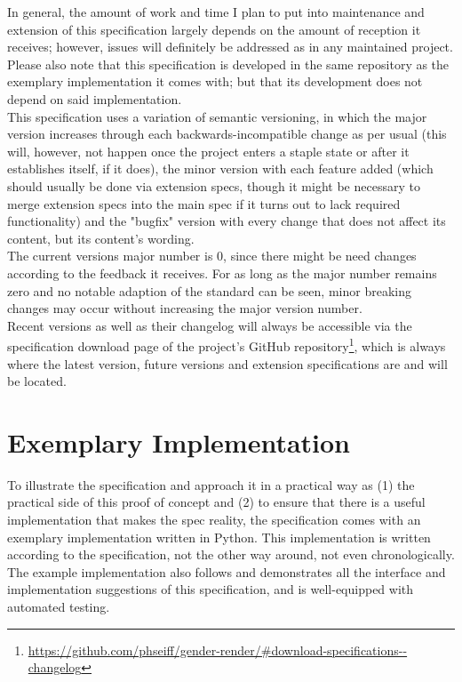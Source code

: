 \documentclass{article}
\begin{document}
    In general, the amount of work and time I plan to put into maintenance and extension of this specification largely depends on the amount of reception it receives;
    however, issues will definitely be addressed as in any maintained project.
    Please also note that this specification is developed in the same repository as the exemplary implementation it comes with;
    but that its development does not depend on said implementation.\\

    This specification uses a variation of semantic versioning, in which the major version increases through each backwards-incompatible change as per usual (this will, however, not happen once the project enters a staple state or after it establishes itself, if it does), the minor version with each feature added (which should usually be done via extension specs, though it might be necessary to merge extension specs into the main spec if it turns out to lack required functionality) and the "bugfix" version with every change that does not affect its content, but its content's wording.\\

    The current versions major number is 0, since there might be need changes according to the feedback it receives.
    For as long as the major number remains zero and no notable adaption of the standard can be seen, minor breaking changes may occur without increasing the major version number.\\

    Recent versions as well as their changelog will always be accessible via the specification download page of the project's GitHub repository\footnote{\url{https://github.com/phseiff/gender-render/\#download-specifications--changelog}}, which is always where the latest version, future versions and extension specifications are and will be located.\\

\section{Exemplary Implementation}

    To illustrate the specification and approach it in a practical way as (1) the practical side of this proof of concept and (2) to ensure that there is a useful implementation that makes the spec reality, the specification comes with an exemplary implementation written in Python.
    This implementation is written according to the specification, not the other way around, not even chronologically.
    The example implementation also follows and demonstrates all the interface and implementation suggestions of this specification, and is well-equipped with automated testing.\\
\end{document}
